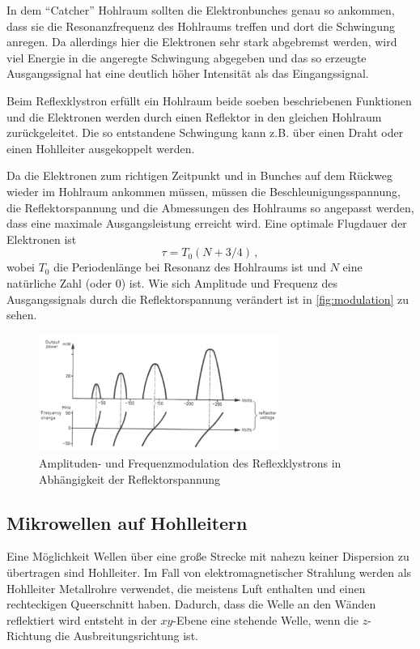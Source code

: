 In dem \enquote{Catcher} Hohlraum sollten die Elektronbunches genau so ankommen, dass sie die Resonanzfrequenz des Hohlraums treffen und dort die Schwingung anregen.
Da allerdings hier die Elektronen sehr stark abgebremst werden, wird viel Energie in die angeregte Schwingung abgegeben 
und das so erzeugte Ausgangssignal hat eine deutlich höher Intensität als das Eingangssignal.

Beim Reflexklystron erfüllt ein Hohlraum beide soeben beschriebenen Funktionen und die Elektronen werden durch einen Reflektor in den gleichen Hohlraum zurückgeleitet.
Die so entstandene Schwingung kann z.B. über einen Draht oder einen Hohlleiter ausgekoppelt werden.

Da die Elektronen zum richtigen Zeitpunkt und in Bunches auf dem Rückweg wieder im Hohlraum ankommen müssen, 
müssen die Beschleunigungsspannung, die Reflektorspannung und die Abmessungen des Hohlraums
so angepasst werden, dass eine maximale Ausgangsleistung erreicht wird.
Eine optimale Flugdauer der Elektronen ist 
\begin{equation}
    \tau = T_0 (N+3/4) \, ,
\end{equation}
wobei $T_0$ die Periodenlänge bei Resonanz des Hohlraums ist und $N$ eine natürliche Zahl (oder 0) ist.
Wie sich Amplitude und Frequenz des Ausgangssignals durch die Reflektorspannung verändert ist in \autoref{fig:modulation} zu sehen.

\begin{figure}
    \centering
    \includegraphics[width=0.7\textwidth]{images/modulation_white.png}
    \caption{Amplituden- und Frequenzmodulation des Reflexklystrons in Abhängigkeit der Reflektorspannung \cite{V53_old}}
    \label{fig:modulation}
\end{figure}

\subsection{Mikrowellen auf Hohlleitern}
\label{ssec:Hohlleiter}

Eine Möglichkeit Wellen über eine große Strecke mit nahezu keiner Dispersion zu übertragen sind Hohlleiter.
Im Fall von elektromagnetischer Strahlung werden als Hohlleiter Metallrohre verwendet, die meistens Luft enthalten und einen rechteckigen Queerschnitt haben.
Dadurch, dass die Welle an den Wänden reflektiert wird entsteht in der $xy$-Ebene eine stehende Welle, wenn die $z$-Richtung die Ausbreitungsrichtung ist.

